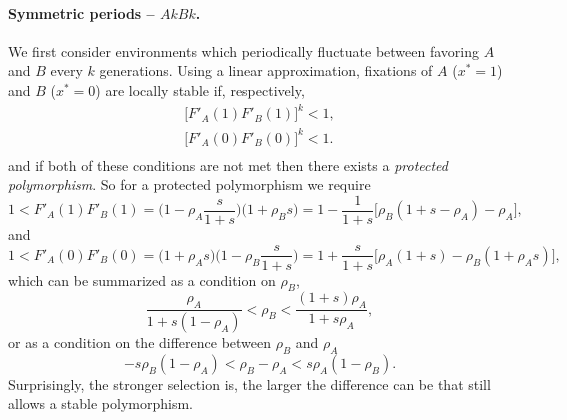 \documentclass[11pt]{extarticle}
\begin{document}
\paragraph{Symmetric periods -- $AkBk$.}
We first consider environments which periodically fluctuate between favoring $A$ and $B$ every $k$ generations.
Using a linear approximation, fixations of $A$ ($x^*=1$) and $B$ ($x^*=0$) are locally stable if, respectively,
\begin{equation}\begin{aligned}
\big[F'_A(1) F'_B(1)\big]^k < 1, \\
\big[F'_A(0) F'_B(0)\big]^k < 1. \\
\end{aligned}\end{equation}
and if both of these conditions are not met then there exists a \emph{protected polymorphism}.
So for a protected polymorphism we require
\begin{equation}
1 < F'_A(1) F'_B(1) = \Big(1-\rho_A\frac{s}{1+s}\Big)\Big(1+\rho_B s\Big) 
= 1-\frac{1}{1+s}\big[\rho_B(1+s-\rho_A)-\rho_A\big],
\end{equation}
and
\begin{equation}
1 < F'_A(0) F'_B(0) = \Big(1+\rho_A s\Big)\Big(1-\rho_B \frac{s}{1+s}\Big) 
= 1+\frac{s}{1+s}\big[\rho_A(1+s) -\rho_B(1+\rho_A s)\big],
\end{equation}
which can be summarized as a condition on $\rho_B$,
\begin{equation} \label{eq:poly_condition_periodic_fluc}
\frac{\rho_A}{1+s(1-\rho_A)} < \rho_B < \frac{(1+s)\rho_A}{1+s\rho_A},
\end{equation}
or as a condition on the difference between $\rho_B$ and $\rho_A$
\begin{equation}
-s\rho_B(1-\rho_A) < \rho_B - \rho_A < s\rho_A(1-\rho_B).
\end{equation}
Surprisingly, the stronger selection is, the larger the difference can be that still allows a stable polymorphism.
\end{document}
